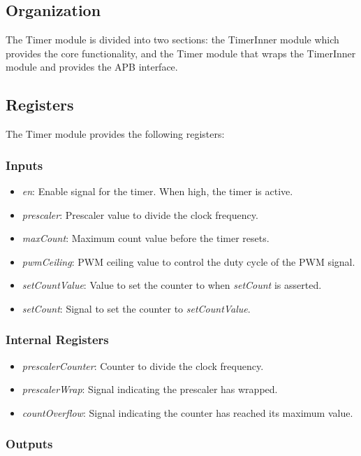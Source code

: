 \subsection{Organization}
The Timer module is divided into two sections: the TimerInner module which provides the core functionality,
and the Timer module that wraps the TimerInner module and provides the APB interface.

\subsection{Registers}
The Timer module provides the following registers:

\subsubsection{Inputs}
\begin{itemize}[noitemsep]
    \item{\textit{en}: Enable signal for the timer. When high, the timer is active.}
    \item{\textit{prescaler}: Prescaler value to divide the clock frequency.}
    \item{\textit{maxCount}: Maximum count value before the timer resets.}
    \item{\textit{pwmCeiling}: PWM ceiling value to control the duty cycle of the PWM signal.}
    \item{\textit{setCountValue}: Value to set the counter to when \textit{setCount} is asserted.}
    \item{\textit{setCount}: Signal to set the counter to \textit{setCountValue}.}
\end{itemize}

\subsubsection{Internal Registers}
\begin{itemize}[noitemsep]
    \item{\textit{prescalerCounter}: Counter to divide the clock frequency.}
    \item{\textit{prescalerWrap}: Signal indicating the prescaler has wrapped.}
    \item{\textit{countOverflow}: Signal indicating the counter has reached its maximum value.}
\end{itemize}

\subsubsection{Outputs}

